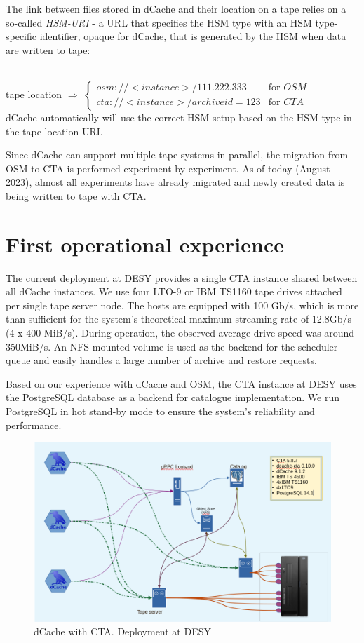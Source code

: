 \documentclass{webofc}
\begin{document}
The link between files stored in dCache and their location on a tape relies on a so-called \textit{HSM-URI} - a URL that specifies the HSM type with an HSM type-specific identifier, opaque for dCache, that is generated by the HSM when data are written to tape:

~\\
tape location $\Rightarrow$ $\begin{cases}
    osm://<instance>/111.222.333 &\text{for } OSM \\
    cta://<instance>/archiveid=123 &\text{for } CTA
\end{cases}$
~\\

dCache automatically will use the correct HSM setup based on the HSM-type in the tape location URI.

Since dCache can support multiple tape systems in parallel, the migration from OSM to CTA is performed experiment by experiment. As of today (August 2023), almost all experiments have already migrated and newly created data is being written to tape with CTA.

\section{First operational experience}
\label{experence}

The current deployment at DESY provides a single CTA instance shared between all dCache instances. We use four LTO-9 or IBM TS1160 tape drives attached per single tape server node. The hosts are equipped with 100 Gb/s, which is more than sufficient for the system's theoretical maximum streaming rate of 12.8Gb/s (4 x 400 MiB/s). During operation, the observed average drive speed was around 350MiB/s.  An NFS-mounted volume is used as the backend for the scheduler queue and easily handles a large number of archive and restore requests.

Based on our experience with dCache and OSM, the CTA instance at DESY uses the PostgreSQL database\cite{postgres} as a backend for catalogue implementation. We run PostgreSQL in hot stand-by mode to ensure the system's reliability and performance.

\begin{figure}[h]
    \centering
    \includegraphics[scale=0.30 ]{cta-deployment-desy.png}
    \caption{dCache with CTA. Deployment at DESY}
    \label{fig:dcache_cta_deplyment}
\end{figure}
\end{document}
